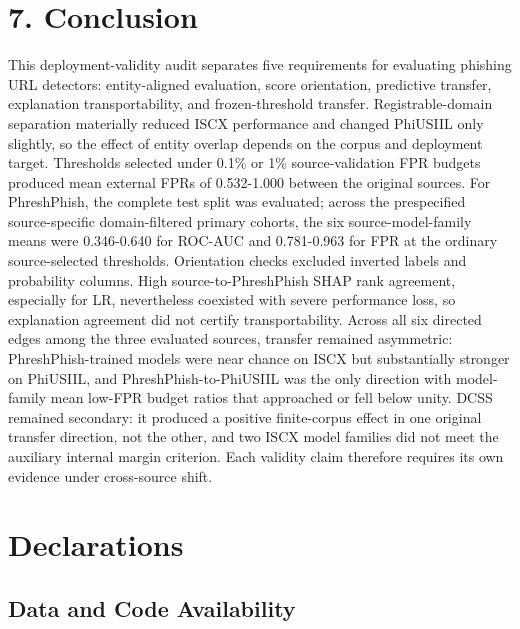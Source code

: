 \documentclass[
  10pt,
]{article}
\begin{document}
\section{7. Conclusion}\label{conclusion}

This deployment-validity audit separates five requirements for
evaluating phishing URL detectors: entity-aligned evaluation, score
orientation, predictive transfer, explanation transportability, and
frozen-threshold transfer. Registrable-domain separation materially
reduced ISCX performance and changed PhiUSIIL only slightly, so the
effect of entity overlap depends on the corpus and deployment target.
Thresholds selected under 0.1\% or 1\% source-validation FPR budgets
produced mean external FPRs of 0.532-1.000 between the original sources.
For PhreshPhish, the complete test split was evaluated; across the
prespecified source-specific domain-filtered primary cohorts, the six
source-model-family means were 0.346-0.640 for ROC-AUC and 0.781-0.963
for FPR at the ordinary source-selected thresholds. Orientation checks
excluded inverted labels and probability columns. High
source-to-PhreshPhish SHAP rank agreement, especially for LR,
nevertheless coexisted with severe performance loss, so explanation
agreement did not certify transportability. Across all six directed
edges among the three evaluated sources, transfer remained asymmetric:
PhreshPhish-trained models were near chance on ISCX but substantially
stronger on PhiUSIIL, and PhreshPhish-to-PhiUSIIL was the only direction
with model-family mean low-FPR budget ratios that approached or fell
below unity. DCSS remained secondary: it produced a positive
finite-corpus effect in one original transfer direction, not the other,
and two ISCX model families did not meet the auxiliary internal margin
criterion. Each validity claim therefore requires its own evidence under
cross-source shift.

\section{Declarations}\label{declarations}

\subsection{Data and Code
Availability}\label{data-and-code-availability}
\end{document}
